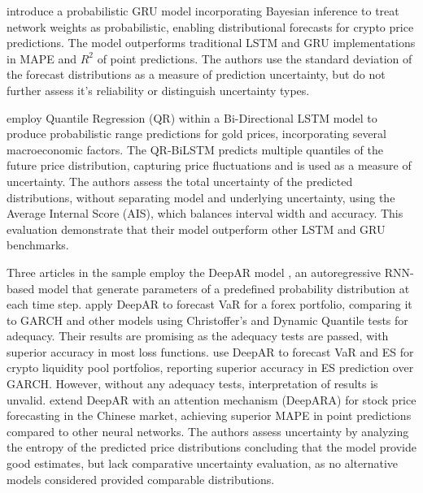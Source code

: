 \textcite{Golnari2024Cryptocurrency} introduce a probabilistic GRU model incorporating Bayesian inference to treat network weights as probabilistic, enabling distributional forecasts
 for crypto price predictions. The model outperforms traditional LSTM and GRU implementations in MAPE and $R^2$ of point predictions. The authors use the standard deviation of the forecast distributions as a measure of prediction uncertainty, but do not further assess it's reliability or distinguish uncertainty types.  

\textcite{Wang2024GoldForecasting} employ Quantile Regression (QR) within a Bi-Directional LSTM model to produce probabilistic range predictions for gold prices, incorporating several macroeconomic factors. The QR-BiLSTM predicts multiple quantiles of the future price distribution, capturing price fluctuations and is used as a measure of uncertainty. The authors assess the total uncertainty of the predicted distributions, without separating model and underlying uncertainty, using the Average Internal Score (AIS), which balances interval width and accuracy. This evaluation demonstrate that their model outperform other LSTM and GRU benchmarks. 

Three articles in the sample employ the DeepAR model \parencite{Salinas2019DeepAR}, an autoregressive RNN-based model that generate parameters of a predefined probability distribution at each time step. \textcite{Fatouros2023DeepVaR} apply DeepAR to forecast VaR for a forex portfolio, comparing it to GARCH and other models using Christoffer's and Dynamic Quantile tests for adequacy. Their results are promising as the adequacy tests are passed, with superior accuracy in most loss functions. \textcite{Almeida2024RiskForecasting} use DeepAR to forecast VaR and ES for crypto liquidity pool portfolios, reporting superior accuracy in ES prediction over GARCH. However, without any adequacy tests, interpretation of results is unvalid. \textcite{Li2024DeepAR} extend DeepAR with an attention mechanism (DeepARA) for stock price forecasting in the Chinese market, achieving superior MAPE in point predictions compared to other neural networks. The authors assess uncertainty by analyzing the entropy of the predicted price distributions concluding that the model provide good estimates, but lack comparative uncertainty evaluation, as no alternative models considered provided comparable distributions.  



